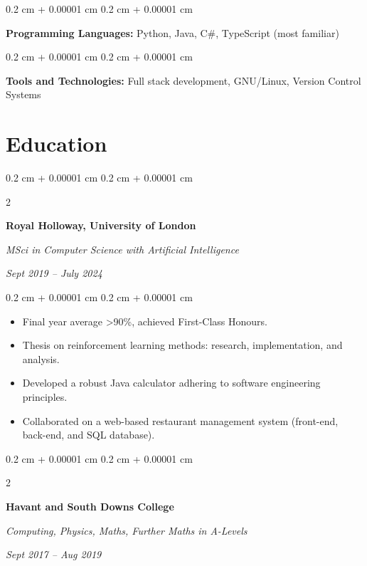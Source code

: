 \documentclass[10pt, letterpaper]{article}
\newenvironment{highlights}{
    \begin{itemize}[
        topsep=0.10 cm,
        parsep=0.10 cm,
        partopsep=0pt,
        itemsep=0pt,
        leftmargin=0.4 cm + 10pt
    ]
}{
    \end{itemize}
} %
\newenvironment{onecolentry}{
    \begin{adjustwidth}{
        0.2 cm + 0.00001 cm
    }{
        0.2 cm + 0.00001 cm
    }
}{
    \end{adjustwidth}
} %
\newenvironment{twocolentry}[2][]{
    \onecolentry
    \def\secondColumn{#2}
    \setcolumnwidth{\fill, 4.5 cm}
    \begin{paracol}{2}
}{
    \switchcolumn \raggedleft \secondColumn
    \end{paracol}
    \endonecolentry
} %
\begin{document}
        
        \begin{onecolentry}
            \textbf{Programming Languages:} Python, Java, C\#, TypeScript (most familiar)
        \end{onecolentry}

        \vspace{0.2 cm}

        \begin{onecolentry}
            \textbf{Tools and Technologies:} Full stack development, GNU/Linux, Version Control Systems
        \end{onecolentry}


    
    \section{Education}



        
        \begin{twocolentry}{
            
            
        \textit{Sept 2019 – July 2024}}
            \textbf{Royal Holloway, University of London}

            \textit{MSci in Computer Science with Artificial Intelligence}
        \end{twocolentry}

        \vspace{0.10 cm}
        \begin{onecolentry}
            \begin{highlights}
                \item Final year average >90\%, achieved First-Class Honours.
                \item Thesis on reinforcement learning methods: research, implementation, and analysis.
                \item Developed a robust Java calculator adhering to software engineering principles.
                \item Collaborated on a web-based restaurant management system (front-end, back-end, and SQL database).
            \end{highlights}
        \end{onecolentry}


        \vspace{0.2 cm}

        \begin{twocolentry}{
            
            
        \textit{Sept 2017 – Aug 2019}}
            \textbf{Havant and South Downs College}

            \textit{Computing, Physics, Maths, Further Maths in A-Levels}
        \end{twocolentry}
\end{document}
